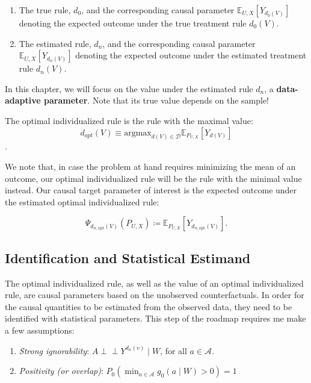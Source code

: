 \documentclass[
  12pt, krantz2,
]{krantz}
\providecommand{\tightlist}{%
  \setlength{\itemsep}{0pt}\setlength{\parskip}{0pt}}
\theoremstyle{definition}
\theoremstyle{definition}
\theoremstyle{definition}
\newcommand{\E}{\mathbb{E}}
\newcommand{\1}{\mathbbm{1}}
\newcommand{\indep}{\mbox{$\perp\!\!\!\perp$}}
\begin{document}
\begin{enumerate}
\def\labelenumi{\arabic{enumi}.}
\item
  The true rule, \(d_0\), and the corresponding causal parameter
  \(\E_{U,X}[Y_{d_0(V)}]\) denoting the expected outcome under the
  true treatment rule \(d_0(V)\).
\item
  The estimated rule, \(d_n\), and the corresponding causal parameter
  \(\E_{U,X}[Y_{d_n(V)}]\) denoting the expected outcome under the
  estimated treatment rule \(d_n(V)\).
\end{enumerate}

In this chapter, we will focus on the value under the estimated rule \(d_n\),
a \textbf{data-adaptive parameter}. Note that its true value depends on the sample!

The optimal individualized rule is the rule with the maximal value:
\[d_{opt}(V) \equiv \text{argmax}_{d(V) \in \mathcal{D}}
\E_{P_{U,X}}[Y_{d(V)}]\].

We note that, in case the problem at hand requires minimizing the mean of an
outcome, our optimal individualized rule will be the rule with the minimal value
instead. Our causal target parameter of interest is the expected outcome under
the estimated optimal individualized rule:

\[\Psi_{d_{n, \text{opt}}(V)}(P_{U,X}) \coloneqq \E_{P_{U,X}}[Y_{d_{n,
\text{opt}}(V)}].\]

\hypertarget{identification-and-statistical-estimand}{%
\subsection{Identification and Statistical Estimand}\label{identification-and-statistical-estimand}}

The optimal individualized rule, as well as the value of an optimal
individualized rule, are causal parameters based on the unobserved
counterfactuals. In order for the causal quantities to be estimated from the
observed data, they need to be identified with statistical parameters. This step
of the roadmap requires me make a few assumptions:

\begin{enumerate}
\def\labelenumi{\arabic{enumi}.}
\tightlist
\item
  \emph{Strong ignorability}: \(A \indep Y^{d_n(v)} \mid W\), for all \(a \in \mathcal{A}\).
\item
  \emph{Positivity (or overlap)}: \(P_0(\min_{a \in \mathcal{A}} g_0(a \mid W) > 0) = 1\)
\end{enumerate}
\end{document}
